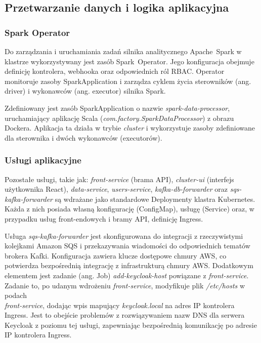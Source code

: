 \subsection{Przetwarzanie danych i logika aplikacyjna}

\subsubsection{Spark Operator}
Do zarządzania i uruchamiania zadań silnika analitycznego \mbox{Apache Spark} w klastrze wykorzystywany jest zasób \mbox{Spark Operator}. Jego konfiguracja obejmuje definicję kontrolera, webhooka oraz odpowiednich ról RBAC. Operator monitoruje zasoby \mbox{SparkApplication} i zarządza cyklem życia sterowników (ang. driver) i wykonawców (ang. executor) silnika Spark.

Zdefiniowany jest zasób SparkApplication o nazwie \textit{spark-data-processor}, uruchamiający aplikację Scala (\textit{com.factory.SparkDataProcessor}) z obrazu Dockera. Aplikacja ta działa w trybie \textit{cluster} i wykorzystuje zasoby zdefiniowane dla sterownika i dwóch wykonawców (executorów).

\subsubsection{Usługi aplikacyjne}
Pozostałe usługi, takie jak: \textit{front-service} (brama API), \textit{cluster-ui} (interfejs użytkownika React), \textit{data-service}, \textit{users-service}, \textit{kafka-db-forwarder} oraz \textit{sqs-kafka-forwarder} są wdrażane jako standardowe Deploymenty klastra Kubernetes. Każda z nich posiada własną konfigurację (ConfigMap), usługę (Service) oraz, w przypadku usług front-endowych i bramy API, definicję Ingress.

Usługa \textit{sqs-kafka-forwarder} jest skonfigurowana do integracji z rzeczywistymi kolejkami Amazon SQS i przekazywania wiadomości do odpowiednich tematów brokera Kafki. Konfiguracja zawiera klucze dostępowe chmury AWS, co potwierdza bezpośrednią integrację z infrastrukturą chmury AWS.
\newpage
Dodatkowym elementem jest zadanie (ang. Job) \textit{add-keycloak-host} powiązane z \textit{front-service}. Zadanie to, po udanym wdrożeniu \textit{front-service}, modyfikuje plik \textit{/etc/hosts} w podach \\ \textit{front-service}, dodając wpis mapujący \textit{keycloak.local} na adres IP kontrolera Ingress. Jest to obejście problemów z rozwiązywaniem nazw DNS dla serwera Keycloak z poziomu tej usługi, zapewniając bezpośrednią komunikację po adresie IP kontrolera Ingress.

